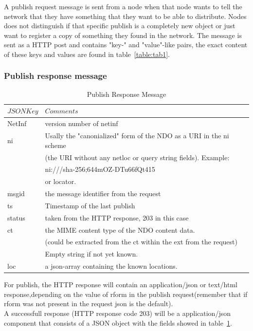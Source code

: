 \documentclass[11pt]{article}
\begin{document}
A publish request message is sent from a node when that node wants to tell the network that they have something that they want to be able to distribute. Nodes does not distinguish if that specific publish is a completely new object or just want to register a copy of something they found in the network. The message is sent as a HTTP post and contains "key-" and "value"-like pairs, the exact content of these keys and values are found in table~\ref{table:tab1}.



\subsubsection{Publish response message}
\begin{table}[H]
\begin{tabular}{|l|l|}
\hline
$JSON Key$&$Comments$\\

\hline

NetInf&version number of netinf\\
\hline
ni&Usally the "canonialized" form of the NDO as a URI in the ni scheme\\
 &(the URI without any netloc or query string fields). Example:\\
  &ni:///sha-256;644mOZ-DTu66fQt415\\
  &or locator.\\
\hline
msgid&the message identifier from the request\\
\hline
ts&Timestamp of the last publish\\
\hline
status&taken from the HTTP response, 203 in this case\\
\hline
ct&the MIME content type of the NDO content data.\\
 &(could be extracted from the ct within the ext from the request)\\
 &Empty string if not yet known.\\
 \hline
loc&a json-array containing the known locations.\\
\hline
\end{tabular}
\caption{Publish Response Message}
\label{table:tab2}
\end{table}
For publish, the HTTP response will contain an application/json or text/html response,depending on the value of rform in the publish request(remember that if rform was not present in the request json is the default).\\
A successfull response (HTTP response code 203) will be a application/json component that consists of a JSON object with the fields showed in table~\ref{table:tab2}.
\end{document}
